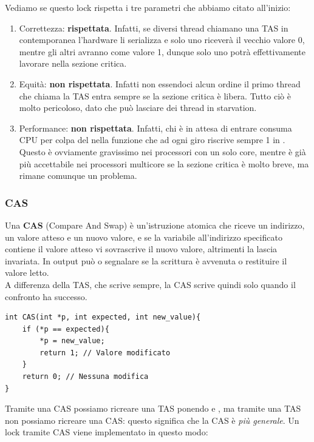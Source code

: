 \documentclass[11pt, a4paper, titlepage, oneside]{scrbook}
\begin{document}
Vediamo se questo lock rispetta i tre parametri che abbiamo citato all'inizio:
\begin{enumerate}
    \item Correttezza: \textbf{rispettata}. Infatti, se diversi thread chiamano una TAS in contemporanea l'hardware li serializza e solo uno riceverà il vecchio valore 0, mentre gli altri avranno come valore 1, dunque solo uno potrà effettivamente lavorare nella sezione critica.
    \item Equità: \textbf{non rispettata}. Infatti non essendoci alcun ordine il primo thread che chiama la TAS entra sempre se la sezione critica è libera. Tutto ciò è molto pericoloso, dato che può lasciare dei thread in starvation.
    \item Performance: \textbf{non rispettata}. Infatti, chi è in attesa di entrare consuma CPU per colpa del  nella funzione  che ad ogni giro riscrive sempre 1 in . Questo è ovviamente gravissimo nei processori con un solo core, mentre è già più accettabile nei processori multicore se la sezione critica è molto breve, ma rimane comunque un problema. 
\end{enumerate}




\subsubsection*{CAS}

\begin{Definizione}[CAS]
\label{def-CAS}
Una \textbf{CAS} (Compare And Swap) è un'istruzione atomica che riceve un indirizzo, un valore atteso e un nuovo valore, e se la variabile all'indirizzo specificato contiene il valore atteso vi sovrascrive il nuovo valore, altrimenti la lascia invariata. In output può o segnalare se la scrittura è avvenuta o restituire il valore letto. \\ 
\NB A differenza della TAS, che scrive sempre, la CAS scrive quindi solo quando il confronto ha successo.
\end{Definizione}

\begin{lstlisting}[style=C]
int CAS(int *p, int expected, int new_value){
    if (*p == expected){
        *p = new_value;
        return 1; // Valore modificato
    }
    return 0; // Nessuna modifica
}
\end{lstlisting}

Tramite una CAS possiamo ricreare una TAS ponendo  e , ma tramite una TAS non possiamo ricreare una CAS: questo significa che la CAS è \textit{più generale}. Un lock tramite CAS viene implementato in questo modo:
\end{document}
